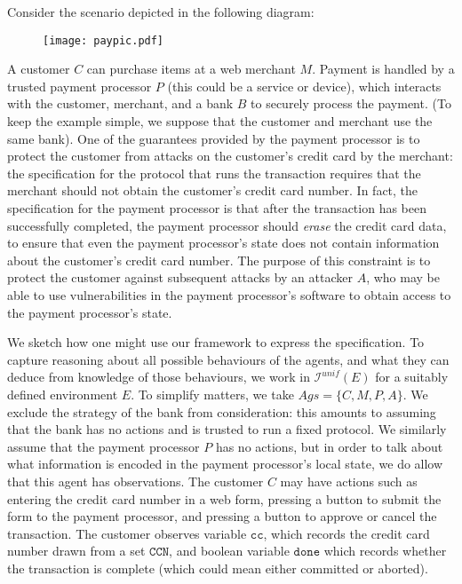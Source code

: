 \documentclass[a4wide]{article}
\theoremstyle{examplesty}
\newcommand{\Ags}{\mathit{Ags}}
\newcommand{\I}{\mathcal{I}}
\newcommand{\cc}{\mathtt{cc}}
\newcommand{\CCN}{\mathtt{CCN}}
\newcommand{\done}{\mathtt{done}}
\newcommand{\Env}{E}
\newcommand{\Iunif}{\I^\unif}
\newcommand{\unif}{\mathit{unif}}
\begin{document}
Consider the scenario  depicted in the  following diagram: 

\begin{figure}[h]  
\centerline{\texttt{[image: paypic.pdf]} } 
\end{figure} 

\noindent
A customer $C$ can purchase 
items at a web merchant $M$. Payment is handled by a trusted payment processor $P$ (this could be a service or device), 
which interacts with the customer, merchant, and a bank $B$ 
to securely process the payment. (To keep the example simple, we suppose that the customer and merchant use the same bank). 
One of the guarantees provided by the 
payment processor is to protect the customer from attacks on the customer's 
credit card by the merchant: the specification for the protocol that runs the transaction 
requires that the merchant should not obtain the customer's credit card number. 
In fact, the specification for the payment processor is that after the transaction has 
been successfully completed, the payment processor should {\em erase} the 
credit card data, to ensure that even the payment 
processor's state does not contain information about the customer's credit card number. 
The purpose of this constraint is to protect the customer against subsequent attacks 
by an attacker $A$, who may be able to use vulnerabilities in the payment processor's
software to obtain access to the payment processor's state. 

We sketch how one might use our framework to express the specification. 
To capture reasoning about all possible behaviours of the agents, and
what they can deduce from knowledge of those behaviours, we work in $\Iunif(\Env)$ for a 
suitably defined environment $\Env$. To simplify matters, we take $\Ags = \{C, M, P, A\}$. 
We exclude the strategy of the bank from consideration: this amounts to assuming that the bank has no actions and is 
trusted to run a fixed protocol. We similarly assume that the payment processor $P$ has no actions, 
but in order to talk about what information is encoded in the payment processor's local state, 
we do allow that this agent has observations. The customer $C$ 
 may have actions such as entering the
credit card number in a web form, pressing a button to submit the form
to the payment processor, and pressing a button to approve or cancel the transaction. 
The customer observes variable $\cc$, which records the credit card number drawn from a set $\CCN$, and
boolean variable $\done$ which records whether the transaction is complete (which could mean either committed or aborted).  
\end{document}
